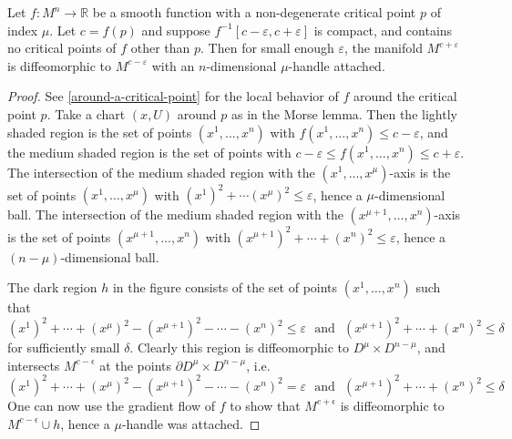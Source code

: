 \begin{thm}
\label{Morse handle attachment}
Let $f : M^n \rightarrow \mathbb R$ be a smooth function with a non-degenerate critical point $p$ of index $\mu$. Let $c=f(p)$ and suppose $f^{-1}[c-\varepsilon,c+\varepsilon]$ is compact, and contains no critical points of $f$ other than $p$. Then for small enough $\varepsilon$, the manifold $M^{c+\varepsilon}$ is diffeomorphic to $M^{c-\varepsilon}$ with an $n$-dimensional $\mu$-handle attached.
\end{thm}
\begin{proof}
See \cref{around-a-critical-point} for the local behavior of $f$ around the critical point $p$. Take a chart $(x,U)$ around $p$ as in the Morse lemma. Then the lightly shaded region is the set of points $(x^1,\ldots,x^n)$ with $f(x^1,\ldots,x^n) \leq c-\varepsilon$, and the medium shaded region is the set of points with $c-\varepsilon \leq f(x^1,\ldots,x^n) \leq c+\varepsilon$. The intersection of the medium shaded region with the $(x^1,\ldots,x^\mu)$-axis is the set of points $(x^1,\ldots,x^\mu)$ with $(x^1)^2 + \cdots (x^\mu)^2 \leq \varepsilon$, hence a $\mu$-dimensional ball. The intersection of the medium shaded region with the $(x^{\mu+1},\ldots,x^n)$-axis is the set of points $(x^{\mu+1},\ldots,x^n)$ with $(x^{\mu+1})^2 + \cdots + (x^n)^2 \leq \varepsilon$, hence a $(n-\mu)$-dimensional ball.

The dark region $h$ in the figure consists of the set of points $(x^1,\ldots,x^n)$ such that 
\[ (x^1)^2 + \cdots + (x^\mu)^2 - (x^{\mu+1})^2 - \cdots - (x^n)^2 \leq \varepsilon \ \ \ \text{and} \ \ \ (x^{\mu+1})^2 + \cdots + (x^n)^2 \leq \delta \]
for sufficiently small $\delta$. Clearly this region is diffeomorphic to $D^\mu \times D^{n-\mu}$, and intersects $M^{c-\epsilon}$ at the points $\partial D^\mu \times D^{n-\mu}$, i.e. 
\[ (x^1)^2 + \cdots + (x^\mu)^2 - (x^{\mu+1})^2 - \cdots - (x^n)^2 = \varepsilon \ \ \ \text{and} \ \ \ (x^{\mu+1})^2 + \cdots + (x^n)^2 \leq \delta \]
One can now use the gradient flow of $f$ to show that $M^{c+\epsilon}$ is diffeomorphic to $M^{c-\epsilon} \cup h$, hence a $\mu$-handle was attached.


\end{proof}
